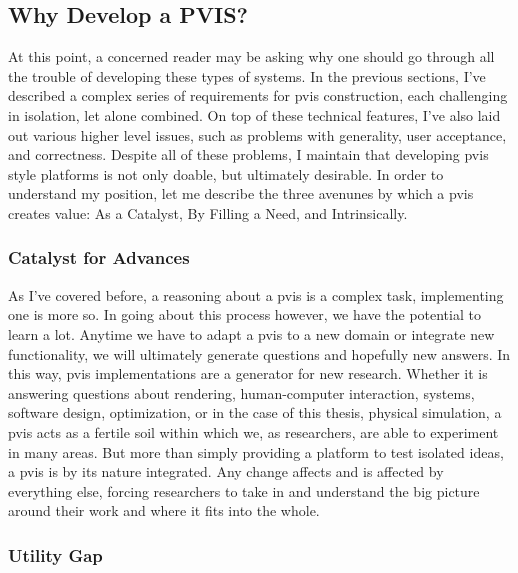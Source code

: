 \documentclass[12pt,oneside,letterpaper]{memoir}
\begin{document}
 
\subsection{Why Develop a PVIS?}

At this point, a concerned reader may be asking why one should go
through all the trouble of developing these types of systems. In the
previous sections, I've described a complex series of requirements for
\gls{pvis} construction, each challenging in isolation, let alone
combined. On top of these technical features, I've also laid out
various higher level issues, such as problems with generality, user
acceptance, and correctness. Despite all of these problems, I maintain
that developing \gls{pvis} style platforms is not only doable, but
ultimately desirable. In order to understand my position, let me
describe the three avenunes by which a \gls{pvis} creates value:
As a Catalyst, By Filling a Need, and Intrinsically.  

\subsubsection{Catalyst for Advances}

As I've covered before, a reasoning about a \gls{pvis} is a complex task,
implementing one is more so. In going about this process however, we
have the potential to learn a lot. Anytime we have to adapt a \gls{pvis} to
a new domain or integrate new functionality, we will ultimately
generate questions and hopefully new answers. In this way, \gls{pvis}
implementations are a generator for new research. Whether it is
answering questions about rendering, human-computer interaction,
systems, software design, optimization, or in the case of this thesis,
physical simulation, a \gls{pvis} acts as a fertile soil within which we, as
researchers, are able to experiment in many areas. But more than
simply providing a platform to test isolated ideas, a \gls{pvis} is by its
nature integrated. Any change affects and is affected by everything
else, forcing researchers to take in and understand the big picture
around their work and where it fits into the whole.

\subsubsection{Utility Gap}
\end{document}
